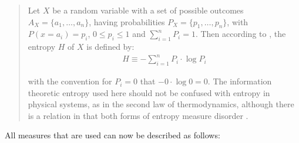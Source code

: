 \begin{quote}
Let $X$ be a random variable with a set of possible outcomes $A_X=\{a_1,\ldots,a_n\}$, having probabilities $P_X=\{p_1,\ldots,p_n\}$, with $P(x=a_i)=p_i$, $0 \leq p_i \leq 1$ and $\sum_{i=1}^n P_i = 1$. Then according to \citet{shannon:1948}, the entropy $H$ of $X$ is defined by:
\begin{eqnarray}
H \equiv -\sum_{i=1}^n P_i \cdot \log P_i
\end{eqnarray}


with the convention for $P_i=0$ that $-0 \cdot \log 0 = 0$. The information theoretic entropy used here should not be confused with entropy in physical systems, as in the second law of thermodynamics, although there is a relation in that both forms of entropy measure disorder \citep[76]{dejong:2000}.
\end{quote}


\noindent All measures that are used can now be described as follows:

